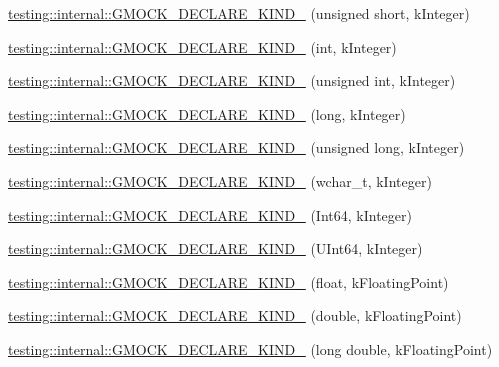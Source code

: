 \begin{DoxyCompactItemize}
\item 
\mbox{\hyperlink{namespacetesting_1_1internal_a6138ee5ce9f509d39e874e4eedb89ae1}{testing\+::internal\+::\+G\+M\+O\+C\+K\+\_\+\+D\+E\+C\+L\+A\+R\+E\+\_\+\+K\+I\+N\+D\+\_\+}} (unsigned short, k\+Integer)
\item 
\mbox{\hyperlink{namespacetesting_1_1internal_a59fb8e3bb6f1fec656ed8bdab0048f9f}{testing\+::internal\+::\+G\+M\+O\+C\+K\+\_\+\+D\+E\+C\+L\+A\+R\+E\+\_\+\+K\+I\+N\+D\+\_\+}} (int, k\+Integer)
\item 
\mbox{\hyperlink{namespacetesting_1_1internal_abdce95ddf8b975d2a17e76a4c5a6c37f}{testing\+::internal\+::\+G\+M\+O\+C\+K\+\_\+\+D\+E\+C\+L\+A\+R\+E\+\_\+\+K\+I\+N\+D\+\_\+}} (unsigned int, k\+Integer)
\item 
\mbox{\hyperlink{namespacetesting_1_1internal_a40597f856b3d94dc82e9fbbf9b027819}{testing\+::internal\+::\+G\+M\+O\+C\+K\+\_\+\+D\+E\+C\+L\+A\+R\+E\+\_\+\+K\+I\+N\+D\+\_\+}} (long, k\+Integer)
\item 
\mbox{\hyperlink{namespacetesting_1_1internal_a8224329431c90b3d943cc43ac92e6e42}{testing\+::internal\+::\+G\+M\+O\+C\+K\+\_\+\+D\+E\+C\+L\+A\+R\+E\+\_\+\+K\+I\+N\+D\+\_\+}} (unsigned long, k\+Integer)
\item 
\mbox{\hyperlink{namespacetesting_1_1internal_af00aa2679c10ed170064e5ec5dd80e29}{testing\+::internal\+::\+G\+M\+O\+C\+K\+\_\+\+D\+E\+C\+L\+A\+R\+E\+\_\+\+K\+I\+N\+D\+\_\+}} (wchar\+\_\+t, k\+Integer)
\item 
\mbox{\hyperlink{namespacetesting_1_1internal_ae1d4cd9aef9a240d257364691ed3679e}{testing\+::internal\+::\+G\+M\+O\+C\+K\+\_\+\+D\+E\+C\+L\+A\+R\+E\+\_\+\+K\+I\+N\+D\+\_\+}} (Int64, k\+Integer)
\item 
\mbox{\hyperlink{namespacetesting_1_1internal_ae09394c3d07a5d99308fc3bbc9edc877}{testing\+::internal\+::\+G\+M\+O\+C\+K\+\_\+\+D\+E\+C\+L\+A\+R\+E\+\_\+\+K\+I\+N\+D\+\_\+}} (U\+Int64, k\+Integer)
\item 
\mbox{\hyperlink{namespacetesting_1_1internal_ad4ebf1b53b79ac38fbd18ccf4d63ceca}{testing\+::internal\+::\+G\+M\+O\+C\+K\+\_\+\+D\+E\+C\+L\+A\+R\+E\+\_\+\+K\+I\+N\+D\+\_\+}} (float, k\+Floating\+Point)
\item 
\mbox{\hyperlink{namespacetesting_1_1internal_a45748f4c08b868cb4939081769cdc7b1}{testing\+::internal\+::\+G\+M\+O\+C\+K\+\_\+\+D\+E\+C\+L\+A\+R\+E\+\_\+\+K\+I\+N\+D\+\_\+}} (double, k\+Floating\+Point)
\item 
\mbox{\hyperlink{namespacetesting_1_1internal_af46fdd94d8aea0da729b554de443315f}{testing\+::internal\+::\+G\+M\+O\+C\+K\+\_\+\+D\+E\+C\+L\+A\+R\+E\+\_\+\+K\+I\+N\+D\+\_\+}} (long double, k\+Floating\+Point)

\end{DoxyCompactItemize}
